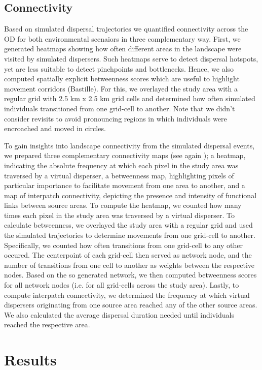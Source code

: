 \documentclass[abstract=on,10pt,a4paper,bibliography=totocnumbered]{article}
\begin{document}
\subsection{Connectivity}
Based on simulated dispersal trajectories we quantified connectivity across the
OD for both environmental scenaiors in three complementary way. First, we
generated heatmaps showing how often different areas in the landscape were
visited by simulated dispersers. Such heatmaps serve to detect dispersal
hotspots, yet are less suitable to detect pinchpoints and bottlenecks. Hence, we
also computed spatially explicit betweenness scores which are useful to
highlight movement corridors (Bastille). For this, we overlayed the study area
with a regular grid with 2.5 km x 2.5 km grid cells and determined how often
simulated individuals transitioned from one grid-cell to another. Note that we
didn't consider revisits to avoid pronouncing regions in which individuals were
encroached and moved in circles.

To gain insights into landscape connectivity from the simulated dispersal
events, we prepared three complementary connectivity maps (see again
\citep{Hofmann.2022}); a heatmap, indicating the absolute frequency at which
each pixel in the study area was traversed by a virtual disperser, a betweenness
map, highlighting pixels of particular importance to facilitate movement from
one area to another, and a map of interpatch connectivity, depicting the
presence and intensity of functional links between source areas. To compute the
heatmap, we counted how many times each pixel in the study area was traversed by
a virtual disperser. To calculate betweenness, we overlayed the study area with
a regular grid and used the simulated trajectories to determine movements from
one grid-cell to another. Specifically, we counted how often transitions from
one grid-cell to any other occured. The centerpoint of each grid-cell then
served as network node, and the number of transitions from one cell to another
as weights between the respective nodes. Based on the so generated network, we
then computed betweenness scores for all network nodes (i.e. for all grid-cells
across the study area). Lastly, to compute interpatch connectivity, we
determined the frequency at which virtual dispersers originating from one source
area reached any of the other source areas. We also calculated the average
dispersal duration needed until individuals reached the respective area.

\section{Results}
\end{document}
